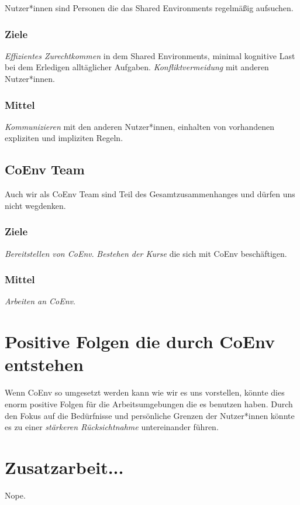 \documentclass{article}
\begin{document}
Nutzer*innen sind Personen die das Shared Environments regelmäßig aufsuchen.

\subsubsection*{Ziele}
\emph{Effizientes Zurechtkommen} in dem Shared Environments, minimal kognitive Last bei dem Erledigen alltäglicher Aufgaben. \emph{Konfliktvermeidung} mit anderen Nutzer*innen.

\subsubsection*{Mittel}
\emph{Kommunizieren} mit den anderen Nutzer*innen, einhalten von vorhandenen expliziten und impliziten Regeln.

\subsection{CoEnv Team}
Auch wir als CoEnv Team sind Teil des Gesamtzusammenhanges und dürfen uns nicht wegdenken.

\subsubsection*{Ziele}
\emph{Bereitstellen von CoEnv}. \emph{Bestehen der Kurse} die sich mit CoEnv beschäftigen.

\subsubsection*{Mittel}
\emph{Arbeiten an CoEnv}.



\section{Positive Folgen die durch CoEnv entstehen}
Wenn CoEnv so umgesetzt werden kann wie wir es uns vorstellen, könnte dies enorm positive Folgen für die Arbeitsumgebungen die es benutzen haben. Durch den Fokus auf die Bedürfnisse und persönliche Grenzen der Nutzer*innen könnte es zu einer \emph{stärkeren Rücksichtnahme} untereinander führen.

\section{Zusatzarbeit...}

Nope.

\newpage



\end{document}
